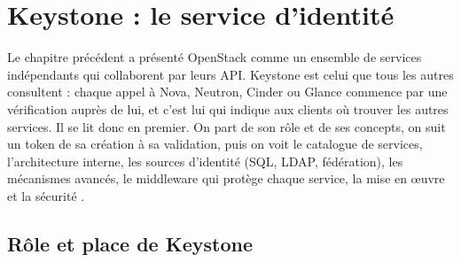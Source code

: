 
\section{Keystone : le service d'identité}\label{chap:keystone}

Le chapitre précédent a présenté OpenStack comme un ensemble de services indépendants qui collaborent par leurs API. Keystone est
celui que tous les autres consultent : chaque appel à Nova, Neutron, Cinder ou Glance commence par une vérification auprès de lui,
et c'est lui qui indique aux clients où trouver les autres services. Il se lit donc en premier. On part de son rôle et de ses
concepts, on suit un token de sa création à sa validation, puis on voit le catalogue de services, l'architecture interne, les sources
d'identité (SQL, LDAP, fédération), les mécanismes avancés, le middleware qui protège chaque service, la mise en œuvre et la sécurité
\parencite{keystone-concepts}.

\subsection{Rôle et place de Keystone}\label{sec:ks-role}

